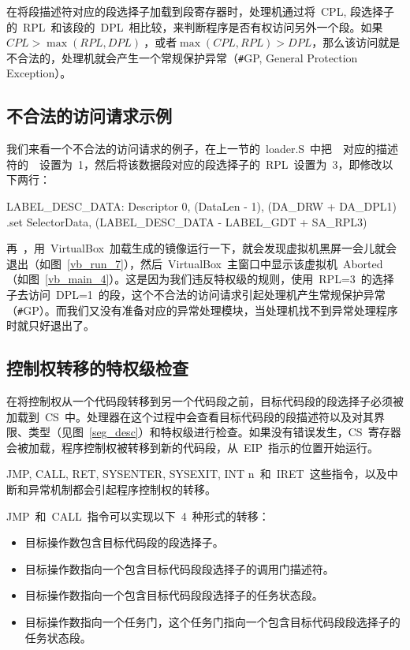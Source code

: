 在将段描述符对应的段选择子加载到段寄存器时，处理机通过将~CPL, 段选择子的~RPL~和该段的~DPL~相比较，来判断程序是否有权访问另外一个段。如果~$CPL>\max{(RPL, DPL)}~$，或者$\max{(CPL, RPL)}>DPL$，那么该访问就是不合法的，处理机就会产生一个常规保护异常（\texttt{\#}GP, General Protection Exception）。

\subsection{不合法的访问请求示例}

我们来看一个不合法的访问请求的例子，在上一节的~loader.S~中把~~对应的描述符的~~设置为~1，然后将该数据段对应的段选择子的~RPL~设置为~3，即修改以下两行：
\begin{Command}
LABEL_DESC_DATA:    Descriptor        0,      (DataLen - 1), (DA_DRW + DA_DPL1)
.set    SelectorData,   (LABEL_DESC_DATA   - LABEL_GDT + SA_RPL3)
\end{Command}



再~，用~VirtualBox~加载生成的镜像运行一下，就会发现虚拟机黑屏一会儿就会退出（如图~\ref{vb_run_7}），然后~VirtualBox~主窗口中显示该虚拟机~Aborted（如图~\ref{vb_main_4}）。这是因为我们违反特权级的规则，使用~RPL=3~的选择子去访问~DPL=1~的段，这个不合法的访问请求引起处理机产生常规保护异常（\texttt{\#}GP）。而我们又没有准备对应的异常处理模块，当处理机找不到异常处理程序时就只好退出了。


\subsection{控制权转移的特权级检查}

在将控制权从一个代码段转移到另一个代码段之前，目标代码段的段选择子必须被加载到~CS~中。处理器在这个过程中会查看目标代码段的段描述符以及对其界限、类型（见图~\ref{seg_desc}）和特权级进行检查。如果没有错误发生，CS~寄存器会被加载，程序控制权被转移到新的代码段，从~EIP~指示的位置开始运行。

JMP, CALL, RET, SYSENTER, SYSEXIT, INT n~和~IRET~这些指令，以及中断和异常机制都会引起程序控制权的转移。

JMP~和~CALL~指令可以实现以下~4~种形式的转移：

\begin{itemize}
\item 目标操作数包含目标代码段的段选择子。
\item 目标操作数指向一个包含目标代码段段选择子的调用门描述符。
\item 目标操作数指向一个包含目标代码段段选择子的任务状态段。
\item 目标操作数指向一个任务门，这个任务门指向一个包含目标代码段段选择子的任务状态段。
\end{itemize}

